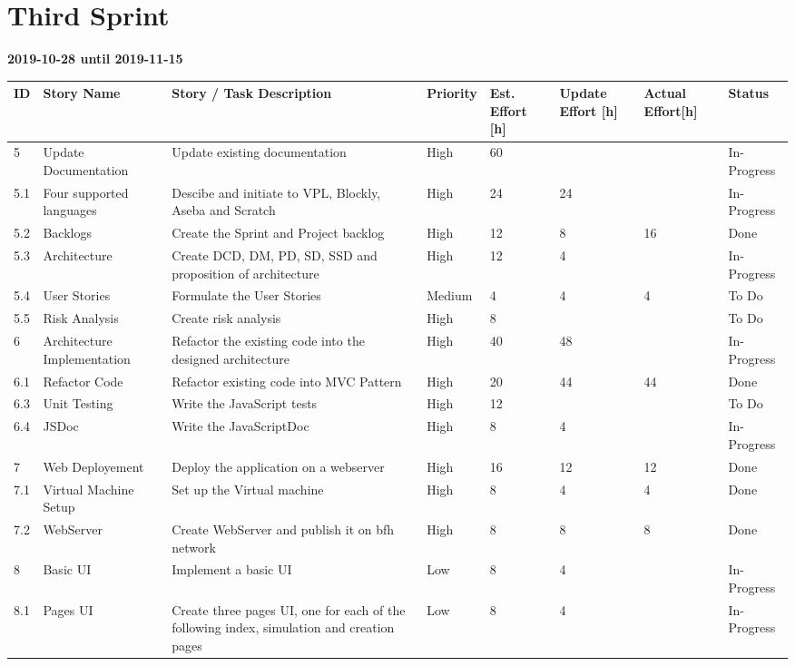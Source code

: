 \documentclass{scrbook}
\begin{document}
\section{Third Sprint}
\textbf{2019-10-28 until 2019-11-15}
\begin{longtable}{p{5mm}|p{2cm}|p{4cm}|p{1cm}|p{1cm}|p{1cm}|p{1cm}|p{15mm}}
  ID                     & Story Name & Story / Task Description & Priority & Est. Effort {[}h{]} & Update Effort {[}h{]} & Actual Effort{[}h{]} & Status                \\ \hline
  5 & Update Documentation & Update existing documentation & High & 60 &  &  & In-Progress \\
  5.1 & Four supported languages & Descibe and initiate to VPL, Blockly, Aseba and Scratch & High & 24 & 24 &  & In-Progress \\ 
  5.2 & Backlogs & Create the Sprint and Project backlog & High & 12 & 8 & 16 & Done \\ 
  5.3 & Architecture & Create DCD, DM, PD, SD, SSD and proposition of architecture & High & 12 & 4 &  & In-Progress \\
  5.4 & User Stories & Formulate the User Stories & Medium & 4 & 4 & 4 & To Do \\ 
  5.5 & Risk Analysis & Create risk analysis & High & 8 &  &  & To Do \\ 
  6 & Architecture Implementation & Refactor the existing code into the designed architecture & High & 40 & 48 &  & In-Progress \\ 
  6.1 & Refactor Code & Refactor existing code into MVC Pattern & High & 20 & 44 & 44 & Done \\ 
  6.3 & Unit Testing & Write the JavaScript tests & High & 12 &  &  & To Do \\
  6.4 & JSDoc & Write the JavaScriptDoc & High & 8 & 4 &  & In-Progress \\ 
  7 & Web Deployement & Deploy the application on a webserver & High & 16 & 12 & 12 & Done \\ 
  7.1 & Virtual Machine Setup & Set up the Virtual machine & High & 8 & 4 & 4 & Done \\ 
  7.2 & WebServer & Create WebServer and publish it on bfh network & High & 8 & 8 & 8 & Done \\
  8 & Basic UI & Implement a basic UI & Low & 8 & 4 &  & In-Progress \\ 
  8.1 & Pages UI & Create three pages UI, one for each of the following index, simulation and creation pages & Low & 8 & 4 &  & In-Progress \\
\end{longtable}
\end{document}
